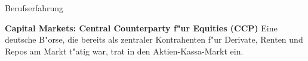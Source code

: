\begin{rubric}{Berufserfahrung}


\entry*[12/2001 - 06/2003] \textbf{Capital Markets: Central Counterparty f"ur Equities (CCP)}\newline
{} 
Eine deutsche B"orse, die bereits als zentraler Kontrahenten f"ur Derivate, Renten und Repos am Markt t"atig war, trat in den Aktien-Kassa-Markt ein. %


\end{rubric}
